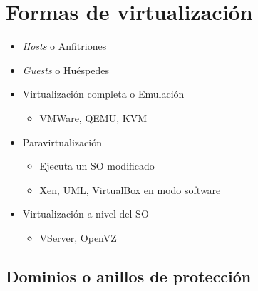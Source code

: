 
% 
% 
% 
% 
\section{Formas de virtualización}
\begin{itemize}
	\item \emph{Hosts} o Anfitriones
	\item \emph{Guests} o Huéspedes
	\item Virtualización completa o Emulación
 	\begin{itemize}
 		\item VMWare, QEMU, KVM
 	\end{itemize}
  	\item Paravirtualización
	\begin{itemize}
 		\item  		Ejecuta un SO modificado
		\item 		Xen, UML, VirtualBox en modo software
	\end{itemize}
		\item Virtualización a nivel del SO
	\begin{itemize}
		\item 	VServer, OpenVZ
	\end{itemize}
\end{itemize}


\subsection {Dominios o anillos de protección}


